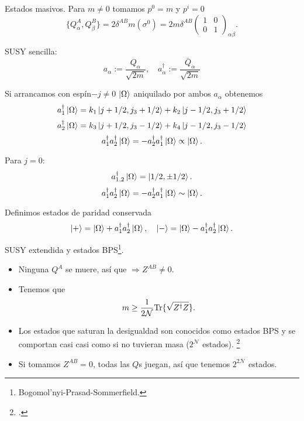 \documentclass[10pt,a4paper]{beamer}
\begin{document}
\begin{frame}{Estados masivos.}
Para $m\neq 0$ tomamos $p^0=m$ y $p^i=0$
\[\{Q^A_\alpha, Q^B_{\dot\beta} \}
  =
  2 \delta^{AB}m(\sigma^0)=2 m\delta^{AB}
  \begin{pmatrix}
    1&0\\
    0&1
  \end{pmatrix}_{\alpha\dot\beta}.
\]

SUSY sencilla:
\[
a_\alpha:= \frac{Q_\alpha}{\sqrt{2m}},\quad
a^{\dag}_{\dot\alpha}:= \frac{\bar Q_{\dot\alpha}}{\sqrt{2m}}
\]

Si arrancamos con espín$-j\neq 0$ $\ket{\Omega}$ aniquilado por ambos $a_\alpha$
obtenemos
\[a^\dag_1 \ket{\Omega} = k_1\ket{j+1/2,j_3 + 1/2}+ k_2\ket{j-1/2,j_3 +
  1/2}
\]\[
a^\dag_2 \ket{\Omega} = k_3\ket{j+1/2,j_3 - 1/2}+ k_4\ket{j-1/2,j_3 -
  1/2}
  \]
  \[a^\dag_1a^\dag_2 \ket{\Omega} = -a^\dag_2a^\dag_1 \ket{\Omega} \propto
  \ket{\Omega}. \]

Para $j=0$:
\[
  a^\dag_{1,2} \ket{\Omega} = \ket{1/2, \pm1/2}.
\]
\[
  a^\dag_{1}a^\dag_2 \ket{\Omega} =- a^\dag_2 a^\dag_{1}\ket{\Omega} \sim
  \ket{\Omega}.
\]

Definimos estados de paridad conservada
\[
  \ket{+} =\ket{\Omega} +  a^\dag_{1}a^\dag_2 \ket{\Omega}, \quad
  \ket{-} =\ket{\Omega} -  a^\dag_{1}a^\dag_2 \ket{\Omega}.
\]
\end{frame}

\begin{frame}{SUSY extendida y estados
  BPS\footnote{Bogomol'nyi-Prasad-Sommerfield.}.}
  
  \begin{itemize}
    \item Ninguna $Q^A$ se muere, así que $\Rightarrow Z^{AB} \neq 0$.
    \item Tenemos que
\[
  m\geq
  \frac{1}{2\mathcal{N}} \mathrm{Tr}\{\sqrt{Z^\dag Z}\}.
\]
\item Los estados que saturan la desigualdad son conocidos como estados BPS y se
  comportan casi casi como si no tuvieran masa ($2^{\mathcal{N}}$ estados). \footcite{wein-susy}

\item Si tomamos $Z^{AB} = 0$, todas las $Q$s juegan, así que tenemos
  $2^{2\mathcal{N}}$ estados.

\end{itemize}

\end{frame}
\end{document}
